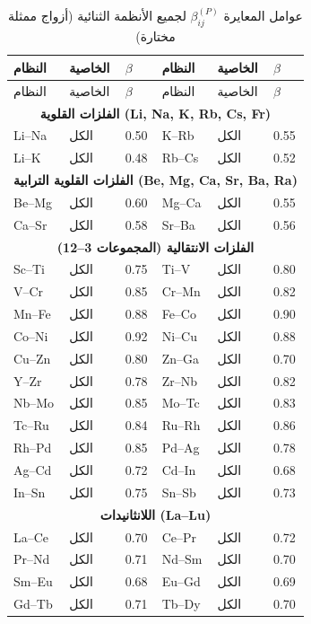 \documentclass[11pt,a4paper]{article}
\begin{document}
\begin{otherlanguage}{arabic}
		\begin{longtable}{p{1.5cm}p{1.5cm}p{1.2cm}p{1.2cm}p{1.2cm}p{1.2cm}}
			\caption{عوامل المعايرة \(\beta_{ij}^{(P)}\) لجميع الأنظمة الثنائية (أزواج ممثلة مختارة)} \label{tab:beta-full} \\
			\toprule
			النظام & الخاصية & \(\beta\) & النظام & الخاصية & \(\beta\) \\
			\midrule
			\endfirsthead
			\toprule
			النظام & الخاصية & \(\beta\) & النظام & الخاصية & \(\beta\) \\
			\midrule
			\endhead
			\multicolumn{6}{c}{\textbf{الفلزات القلوية (Li, Na, K, Rb, Cs, Fr)}} \\
			Li–Na & الكل & 0.50 & K–Rb & الكل & 0.55 \\
			Li–K  & الكل & 0.48 & Rb–Cs & الكل & 0.52 \\
			\multicolumn{6}{c}{\textbf{الفلزات القلوية الترابية (Be, Mg, Ca, Sr, Ba, Ra)}} \\
			Be–Mg & الكل & 0.60 & Mg–Ca & الكل & 0.55 \\
			Ca–Sr & الكل & 0.58 & Sr–Ba & الكل & 0.56 \\
			\multicolumn{6}{c}{\textbf{الفلزات الانتقالية (المجموعات 3–12)}} \\
			Sc–Ti & الكل & 0.75 & Ti–V & الكل & 0.80 \\
			V–Cr  & الكل & 0.85 & Cr–Mn & الكل & 0.82 \\
			Mn–Fe & الكل & 0.88 & Fe–Co & الكل & 0.90 \\
			Co–Ni & الكل & 0.92 & Ni–Cu & الكل & 0.88 \\
			Cu–Zn & الكل & 0.80 & Zn–Ga & الكل & 0.70 \\
			Y–Zr  & الكل & 0.78 & Zr–Nb & الكل & 0.82 \\
			Nb–Mo & الكل & 0.85 & Mo–Tc & الكل & 0.83 \\
			Tc–Ru & الكل & 0.84 & Ru–Rh & الكل & 0.86 \\
			Rh–Pd & الكل & 0.85 & Pd–Ag & الكل & 0.78 \\
			Ag–Cd & الكل & 0.72 & Cd–In & الكل & 0.68 \\
			In–Sn & الكل & 0.75 & Sn–Sb & الكل & 0.73 \\
			\multicolumn{6}{c}{\textbf{اللانثانيدات (La–Lu)}} \\
			La–Ce & الكل & 0.70 & Ce–Pr & الكل & 0.72 \\
			Pr–Nd & الكل & 0.71 & Nd–Sm & الكل & 0.70 \\
			Sm–Eu & الكل & 0.68 & Eu–Gd & الكل & 0.69 \\
			Gd–Tb & الكل & 0.71 & Tb–Dy & الكل & 0.70 \\

\end{longtable}
\end{otherlanguage}
\end{document}
